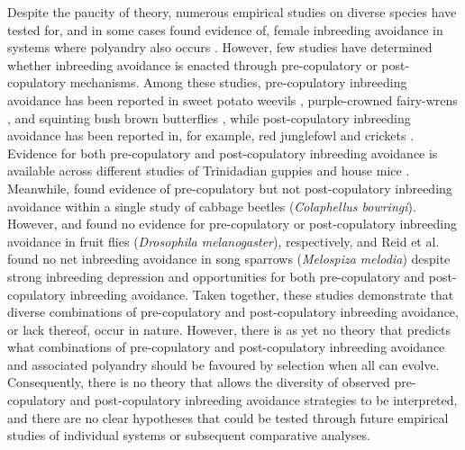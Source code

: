 \documentclass[12pt]{article}
\begin{document}
Despite the paucity of theory, numerous empirical studies on diverse species have tested for, and in some cases found evidence of, female inbreeding avoidance in systems where polyandry also occurs \cite[][but see \citealt{Reid2015a}]{Tregenza2002, Varian-Ramos2012, Kingma2013, Arct2015}. However, few studies have determined whether inbreeding avoidance is enacted through pre-copulatory or post-copulatory mechanisms. Among these studies, pre-copulatory inbreeding avoidance has been reported in sweet potato weevils \cite[\textit{Cylas formicarius};][]{Kuriwada2011}, purple-crowned fairy-wrens \cite[\textit{Malurus coronatus};][]{Kuriwada2011}, and squinting bush brown butterflies \cite[\textit{Bicyclus anynana};][]{Fischer2015}, while post-copulatory inbreeding avoidance has been reported in, for example, red junglefowl \cite[\textit{Gallus gallus};][]{Pizzari2004} and crickets \cite[\textit{Teleogryllus oceanicus}, \textit{Gryllus bimaculatus};][]{Simmons2006, Bretman2009}. Evidence for both pre-copulatory and post-copulatory inbreeding avoidance is available across different studies of Trinidadian guppies \cite[\textit{Poecilia reticulata};][]{Gasparini2011, Daniel2015} and house mice \cite[\textit{Mus domesticus};][]{Potts1991, Firman2015}. Meanwhile, \cite{Liu2014} found evidence of pre-copulatory but not post-copulatory inbreeding avoidance within a single study of cabbage beetles (\textit{Colaphellus bowringi}). However, \cite{Ala-Honkola2011} and \cite{Tan2012} found no evidence for pre-copulatory or post-copulatory inbreeding avoidance in fruit flies (\textit{Drosophila melanogaster}), respectively, and Reid et al. \citeyearpar{Reid2014, Reid2015} found no net inbreeding avoidance in song sparrows (\textit{Melospiza melodia}) despite strong inbreeding depression and opportunities for both pre-copulatory and post-copulatory inbreeding avoidance. Taken together, these studies demonstrate that diverse combinations of pre-copulatory and post-copulatory inbreeding avoidance, or lack thereof, occur in nature. However, there is as yet no theory that predicts what combinations of pre-copulatory and post-copulatory inbreeding avoidance and associated polyandry should be favoured by selection when all can evolve. Consequently, there is no theory that allows the diversity of observed pre-copulatory and post-copulatory inbreeding avoidance strategies to be interpreted, and there are no clear hypotheses that could be tested through future empirical studies of individual systems or subsequent comparative analyses.
\end{document}
